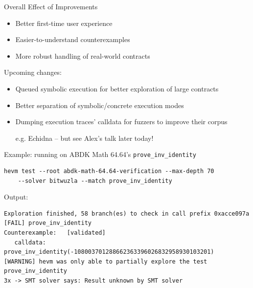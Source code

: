 \documentclass[aspectratio=169]{beamer}
\begin{document}
\begin{frame}{Overall Effect of Improvements}
\begin{itemize}
    \item Better first-time user experience
    \item Easier-to-understand counterexamples
    \item More robust handling of real-world contracts
\end{itemize}
\bigskip

\bigskip

Upcoming changes:
\begin{itemize}
    \item Queued symbolic execution for better exploration of large contracts
    \item Better separation of symbolic/concrete execution modes
    \item Dumping execution traces' calldata for fuzzers to improve their corpus

        e.g. Echidna -- but see Alex's talk later today!
\end{itemize}
\end{frame}

\begin{frame}[fragile]{Example: running on ABDK Math 64.64's \texttt{prove\_inv\_identity}}
\begin{Verbatim}
hevm test --root abdk-math-64.64-verification --max-depth 70
    --solver bitwuzla --match prove_inv_identity
\end{Verbatim}
\bigskip

Output:
\begin{Verbatim}
Exploration finished, 58 branch(es) to check in call prefix 0xacce097a
[FAIL] prove_inv_identity
Counterexample:   [validated]
   calldata: prove_inv_identity(-108003701288662363396026832958930103201)
[WARNING] hevm was only able to partially explore the test prove_inv_identity
3x -> SMT solver says: Result unknown by SMT solver
\end{Verbatim}
\end{frame}
\end{document}
